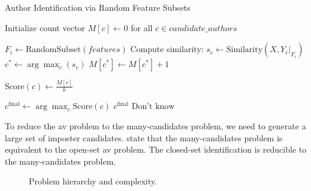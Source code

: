 \begin{algorithm}
    \caption{Author Identification via Random Feature Subsets}
    \label{lst:many_candidate_algo}
    \begin{algorithmic}[1]
            \State Initialize count vector $M[c] \gets 0$ for all $c \in candidate\_authors$

             
                \State $F_i \gets \text{RandomSubset}(features)$ 
                    \State Compute similarity: $s_c \gets \text{Similarity}(X, Y_c|_{F_i})$ 
                \EndFor
                \State $c^* \gets \arg\max_{c} (s_c)$
                \State $M[c^*] \gets M[c^*] + 1$  
            \EndFor

                \State $\text{Score}(c) \gets \frac{M[c]}{k}$ 
            \EndFor

            \State $c^{\text{final}} \gets \arg\max_{c} \text{Score}(c)$
             
                \State \Return $c^{\text{final}}$
            \Else
                \State \Return $\text{Don't know}$
            \EndIf
        \EndProcedure
    \end{algorithmic}
\end{algorithm}

To reduce the \ac{av} problem to the many-candidates problem, we need to generate a large set of imposter candidates.
\citet{koppel_determining_2014} state that the many-candidates problem is equivalent to the open-set \ac{av} problem.
The closed-set identification is reducible to the many-candidates problem.

\begin{figure}[htbp]
    \centering
    
    \caption{Problem hierarchy and complexity.}
    \label{fig:problem_hierarchy}
\end{figure}